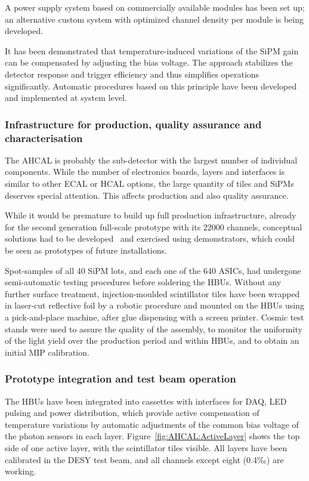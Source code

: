 A power supply system based on commercially available modules has been set up; an alternative custom system with optimized channel density per module is being developed.

It has been demonstrated that temperature-induced variations of the SiPM gain can be compensated by adjusting the bias voltage. The approach stabilizes the detector response and trigger efficiency and thus simplifies operations significantly. Automatic procedures based on this principle have been developed and implemented at system level.

\subsubsection{Infrastructure for production, quality assurance and characterisation}

The AHCAL is probably the sub-detector with the largest number of individual components. While the number of electronics boards, layers and interfaces is similar to other ECAL or HCAL options, the large quantity of tiles and SiPMs deserves special attention. This affects production and also quality assurance.

While it would be premature to build up full production infrastructure, already for the second generation full-scale prototype with its 22000 channels, conceptual solutions had to be developed~\cite{Munwes:2634923} and exercised using demonstrators, which could be seen as prototypes of future installations.

Spot-samples of all 40 SiPM lots, and each one of the 640 ASICs, had undergone semi-automatic testing procedures before soldering the HBUs. Without any further surface treatment, injection-moulded scintillator tiles have been wrapped in laser-cut reflective foil by a robotic procedure and mounted on the HBUs using a pick-and-place machine, after glue dispensing with a screen printer. Cosmic test stands were used to assure the quality of the assembly, to monitor the uniformity of the light yield over the production period and within HBUs, and to obtain an initial MIP calibration.

\subsubsection{Prototype integration and test beam operation}
 The HBUs have been integrated into cassettes with interfaces for DAQ, LED pulsing and power distribution, which provide active compensation of temperature variations by automatic adjustments of the common bias voltage of the photon sensors in each layer. Figure~\ref{fig:AHCAL:ActiveLayer} shows the top side of one active layer, with the scintillator tiles visible. All layers have been calibrated in the DESY test beam, and all channels except eight (0.4‰) are working.

